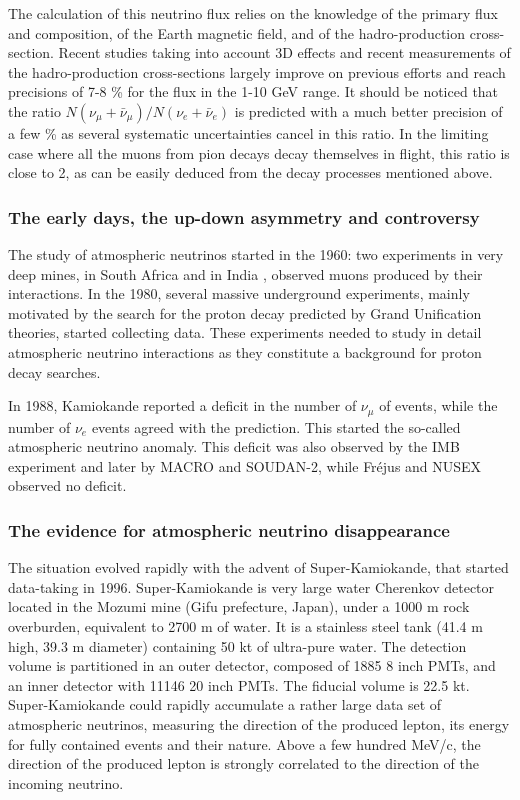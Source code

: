 \documentclass[preprint,12pt]{elsarticle}
\begin{document}
The calculation of this neutrino flux \cite{ref:Ga2002} relies on the knowledge of the primary flux and composition, of the Earth magnetic field, and of the hadro-production cross-section. Recent studies \cite{ref:midori,ref:barr,ref:fluka} taking into account 3D effects and recent measurements of the hadro-production cross-sections largely improve on previous efforts and reach precisions of 7-8 \% for the flux in the 1-10 GeV range. It should be noticed that the ratio $N(\nu_\mu + \bar{\nu}_\mu)/N(\nu_e + \bar{\nu}_e)$ is predicted with a much better precision of a few \% as several systematic uncertainties cancel in this ratio. In the limiting case where all the muons from pion decays decay themselves in flight, this ratio is close to 2, as can be easily deduced from the decay processes mentioned above.

\subsubsection{The early days, the up-down asymmetry and controversy}

The study of atmospheric neutrinos started in the 1960: two experiments in very deep mines, in South Africa \cite{ref:reinesAtm} and in India \cite{ref:achar}, observed muons produced by their interactions. 
In the 1980, several massive underground experiments, mainly motivated by the search for the proton decay predicted by Grand Unification theories, started collecting data. These experiments needed to study in detail atmospheric neutrino interactions as they constitute a background for proton decay searches.

In 1988, Kamiokande reported a deficit in the number of $\nu_\mu$ of events, while the number of $\nu_e$ events agreed with the prediction. This started the so-called atmospheric neutrino anomaly. This deficit was also observed by the IMB experiment and later by MACRO and SOUDAN-2, while Fr\'ejus and NUSEX observed no deficit. 


\subsubsection{The evidence for atmospheric neutrino disappearance}


The situation evolved rapidly with the advent of Super-Kamiokande, that started data-taking in 1996. Super-Kamiokande is very large water Cherenkov detector located in the Mozumi mine (Gifu prefecture, Japan), under a 1000 m rock overburden, equivalent to 2700 m of water. It is a stainless steel tank (41.4 m high, 39.3 m diameter) containing 50 kt of ultra-pure water. The detection volume is partitioned in an outer detector, composed of 1885 8 inch PMTs, and an inner detector with 11146 20 inch PMTs. The fiducial volume is 22.5 kt. Super-Kamiokande could rapidly accumulate a rather large data set of atmospheric neutrinos, measuring the direction of the produced lepton, its energy for fully contained events and their nature. Above a few hundred MeV/c, the direction of the produced lepton is strongly correlated to the direction of the incoming neutrino.  
\end{document}
